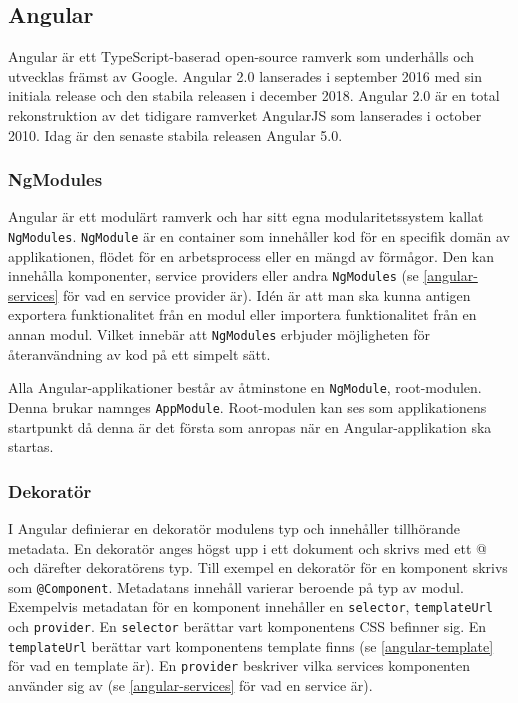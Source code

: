 
\subsection{Angular}
Angular är ett TypeScript-baserad open-source ramverk som underhålls och utvecklas främst av Google. Angular 2.0 lanserades i september 2016 med sin initiala release och den stabila releasen i december 2018. Angular 2.0 är en total rekonstruktion av det tidigare ramverket AngularJS som lanserades i october 2010. Idag är den senaste stabila releasen Angular 5.0. \cite{angular-date}

\subsubsection{NgModules}
Angular är ett modulärt ramverk och har sitt egna modularitetssystem kallat \texttt{NgModules}.\cite{angular-architecture} \texttt{NgModule} är en container som innehåller kod för en specifik domän av applikationen, flödet för en arbetsprocess eller en mängd av förmågor. Den kan innehålla komponenter, service providers eller andra \texttt{NgModules} (se \ref{angular-services} för vad en service provider är). Idén är att man ska kunna antigen exportera funktionalitet från en modul eller importera funktionalitet från en annan modul. Vilket innebär att \texttt{NgModules} erbjuder möjligheten för återanvändning av kod på ett simpelt sätt. 

Alla Angular-applikationer består av åtminstone en \texttt{NgModule}, root-modulen. Denna brukar namnges \texttt{AppModule}.\cite{angular-modules} Root-modulen kan ses som applikationens startpunkt då denna är det första som anropas när en Angular-applikation ska startas.


\subsubsection{Dekoratör}
I Angular definierar en dekoratör modulens typ och innehåller tillhörande metadata. En dekoratör anges högst upp i ett dokument och skrivs med ett @ och därefter dekoratörens typ. Till exempel en dekoratör för en komponent skrivs som \texttt{@Component}.\cite{angular-modules} Metadatans innehåll varierar beroende på typ av modul. Exempelvis metadatan för en komponent innehåller en \texttt{selector}, \texttt{templateUrl} och \texttt{provider}. En \texttt{selector} berättar vart komponentens CSS befinner sig. En \texttt{templateUrl} berättar vart komponentens template finns (se \ref{angular-template} för vad en template är). En \texttt{provider} beskriver vilka services komponenten använder sig av (se \ref{angular-services} för vad en service är). \cite{angular-components}

